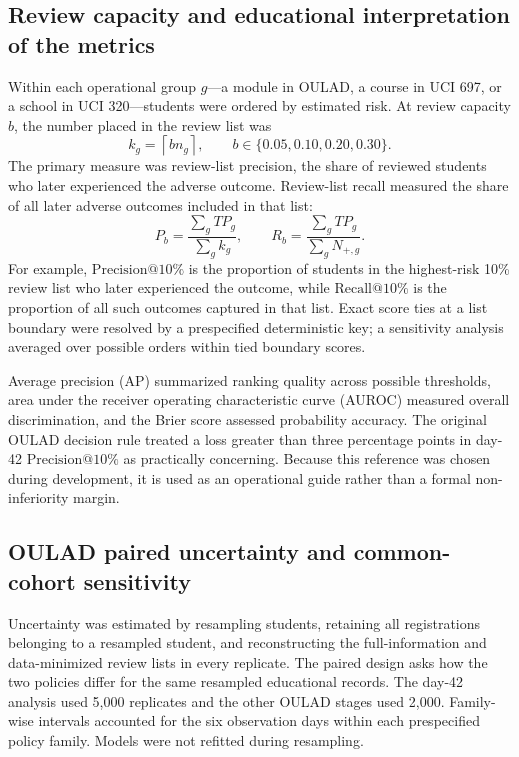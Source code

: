 \documentclass[education,article,submit,moreauthors]{Definitions/mdpi}
\makeatletter
\newcommand{\Pten}{\ensuremath{\mathrm{Precision}@10\%}}
\newcommand{\Rten}{\ensuremath{\mathrm{Recall}@10\%}}
\makeatother
\begin{document}
\subsection{Review capacity and educational interpretation of the metrics}

Within each operational group $g$---a module in OULAD, a course in UCI 697, or a school in UCI 320---students were ordered by estimated risk. At review capacity $b$, the number placed in the review list was
\[
  k_g=\left\lceil b n_g\right\rceil, \qquad b\in\{0.05,0.10,0.20,0.30\}.
\]
The primary measure was review-list precision, the share of reviewed students who later experienced the adverse outcome. Review-list recall measured the share of all later adverse outcomes included in that list:
\[
  P_b=\frac{\sum_g TP_g}{\sum_g k_g}, \qquad
  R_b=\frac{\sum_g TP_g}{\sum_g N_{+,g}}.
\]
For example, \Pten{} is the proportion of students in the highest-risk 10\% review list who later experienced the outcome, while \Rten{} is the proportion of all such outcomes captured in that list. Exact score ties at a list boundary were resolved by a prespecified deterministic key; a sensitivity analysis averaged over possible orders within tied boundary scores.

Average precision (AP) summarized ranking quality across possible thresholds, area under the receiver operating characteristic curve (AUROC) measured overall discrimination, and the Brier score assessed probability accuracy. The original OULAD decision rule treated a loss greater than three percentage points in day-42 \Pten{} as practically concerning. Because this reference was chosen during development, it is used as an operational guide rather than a formal non-inferiority margin.

\subsection{OULAD paired uncertainty and common-cohort sensitivity}

Uncertainty was estimated by resampling students, retaining all registrations belonging to a resampled student, and reconstructing the full-information and data-minimized review lists in every replicate. The paired design asks how the two policies differ for the same resampled educational records. The day-42 analysis used 5,000 replicates and the other OULAD stages used 2,000. Family-wise intervals accounted for the six observation days within each prespecified policy family. Models were not refitted during resampling.
\end{document}
